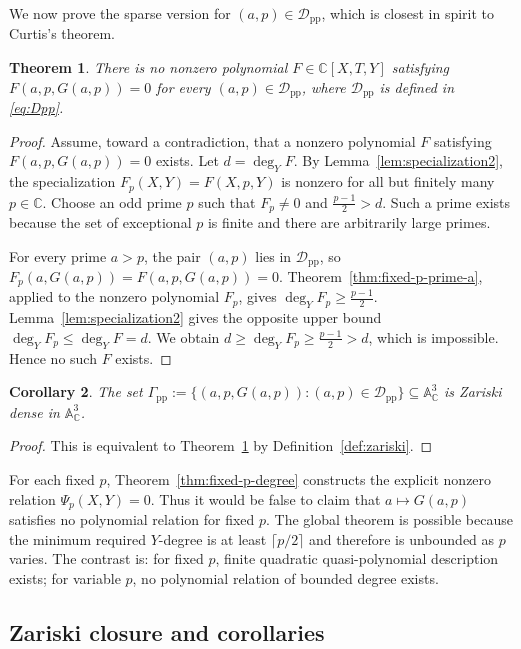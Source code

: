 \documentclass[reqno, 12pt]{article}
\numberwithin{equation}{section}
\newtheorem{theorem}{Theorem}[section]
\newtheorem{corollary}[theorem]{Corollary}
\theoremstyle{definition}
\newcommand{\Aff}{\mathbb A}
\newcommand{\CC}{\mathbb{C}}
\newcommand{\cD}{\mathcal D}
\begin{document}
We now prove the sparse version for $(a,p)\in\cD_{\mathrm{pp}}$, which is closest in spirit to Curtis's theorem.

\begin{theorem}\label{thm:global-prime-prime}
There is no nonzero polynomial $F\in\CC[X,T,Y]$ satisfying $F(a,p,G(a,p))=0$ for every $(a,p)\in\cD_{\mathrm{pp}}$, where $\cD_{\mathrm{pp}}$ is defined in \cref{eq:Dpp}.
\end{theorem}
\begin{proof}
Assume, toward a contradiction, that a nonzero polynomial $F$ satisfying $F(a,p,G(a,p))=0$ exists.  Let $d=\deg_YF$.
By Lemma~\ref{lem:specialization2}, the specialization
$F_p(X,Y)=F(X,p,Y)$ is nonzero for all but finitely many $p\in\CC$.
Choose an odd prime $p$ such that $F_p\ne0$ and $\frac{p-1}{2}>d$.
Such a prime exists because the set of exceptional $p$ is finite and there
are arbitrarily large primes.

For every prime $a>p$, the pair $(a,p)$ lies in $\cD_{\mathrm{pp}}$, so $F_p(a,G(a,p))=F(a,p,G(a,p))=0$.
Theorem~\ref{thm:fixed-p-prime-a}, applied to the nonzero polynomial $F_p$,
gives $\deg_YF_p\ge\frac{p-1}{2}$.
Lemma~\ref{lem:specialization2} gives the opposite upper bound $\deg_YF_p\le\deg_YF=d$.
We obtain $d\ge\deg_YF_p\ge\frac{p-1}{2}>d$, which is impossible.  Hence no such $F$ exists.
\end{proof}

\begin{corollary}\label{cor:zariski-prime-prime}
The set $\Gamma_{\mathrm{pp}}:=\{(a,p,G(a,p)):(a,p)\in\cD_{\mathrm{pp}}\} \subseteq\Aff^3_{\CC}$ is Zariski dense in $\Aff^3_{\CC}$.
\end{corollary}
\begin{proof}
This is equivalent to Theorem~\ref{thm:global-prime-prime} by Definition~\ref{def:zariski}.
\end{proof}


For each fixed $p$, Theorem~\ref{thm:fixed-p-degree} constructs the explicit nonzero relation $\Psi_p(X,Y)=0$.  Thus it would be false to claim that $a\mapsto G(a,p)$ satisfies no polynomial relation for fixed $p$.
The global theorem is possible because the minimum required $Y$-degree is at least $\lceil p/2\rceil$ and therefore is unbounded as $p$ varies. 
The contrast is: for fixed $p$, finite quadratic quasi-polynomial description exists; for variable $p$, no polynomial relation of bounded degree exists.


\subsection{Zariski closure and corollaries}\label{sec:four-variable}
\end{document}
